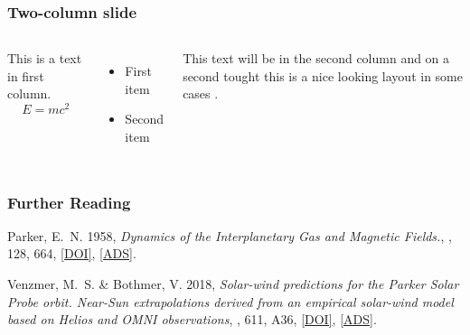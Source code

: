 \documentclass[11pt]{beamer}	%
\begin{document}
\begin{frame}
	\frametitle{Two-column slide}
	\begin{columns}[t]
	
	This is a text in first column.
	$$E=mc^2$$
	\begin{itemize}
	\item First item
	\item Second item
	\end{itemize}
	
	This text will be in the second column
	and on a second tought this is a nice looking
	layout in some cases \citep{Venzmer2018}.
	\end{columns}
\end{frame}

\begin{frame}[allowframebreaks]
	\frametitle<presentation>{Further Reading}
	\begin{thebibliography}{10}
	
		\beamertemplatebookbibitems
		
		\beamertemplatearticlebibitems
		
			{Parker}, E.~N. 1958, \emph{{Dynamics of the Interplanetary Gas and Magnetic Fields.}}, \apj, 128, 664, \href{http://dx.doi.org/10.1086/146579}{[DOI]}, \href{http://adsabs.harvard.edu/abs/1958ApJ...128..664P}{[ADS]}.
			
			{Venzmer}, M.~S. \& {Bothmer}, V. 2018, \emph{{Solar-wind predictions for the
			Parker Solar Probe orbit. Near-Sun extrapolations derived from an empirical
			solar-wind model based on Helios and OMNI observations}}, \aap, 611, A36,
			\href{http://dx.doi.org/10.1051/0004-6361/201731831}{[DOI]},
			\href{http://adsabs.harvard.edu/abs/2018A\%26A...611A..36V}{[ADS]}.

	\end{thebibliography}
\end{frame}
\end{document}
